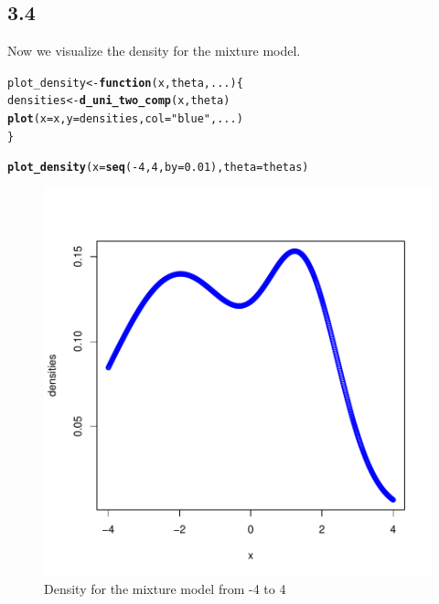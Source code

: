\documentclass[10pt, a4paper, english]{article}\usepackage[]{graphicx}\usepackage[dvipsnames]{xcolor}
\makeatletter
\def\maxwidth{ %
  \ifdim\Gin@nat@width>\linewidth
    \linewidth
  \else
    \Gin@nat@width
  \fi
}
\newcommand{\hlnum}[1]{\textcolor[rgb]{0.686,0.059,0.569}{#1}}%
\newcommand{\hlstr}[1]{\textcolor[rgb]{0.192,0.494,0.8}{#1}}%
\newcommand{\hlopt}[1]{\textcolor[rgb]{0,0,0}{#1}}%
\newcommand{\hlstd}[1]{\textcolor[rgb]{0.345,0.345,0.345}{#1}}%
\newcommand{\hlkwa}[1]{\textcolor[rgb]{0.161,0.373,0.58}{\textbf{#1}}}%
\newcommand{\hlkwb}[1]{\textcolor[rgb]{0.69,0.353,0.396}{#1}}%
\newcommand{\hlkwc}[1]{\textcolor[rgb]{0.333,0.667,0.333}{#1}}%
\newcommand{\hlkwd}[1]{\textcolor[rgb]{0.737,0.353,0.396}{\textbf{#1}}}%
\newenvironment{kframe}{%
 \def\at@end@of@kframe{}%
 \ifinner\ifhmode%
  \def\at@end@of@kframe{\end{minipage}}%
  \begin{minipage}{\columnwidth}%
 \fi\fi%
 \def\FrameCommand##1{\hskip\@totalleftmargin \hskip-\fboxsep
 \colorbox{shadecolor}{##1}\hskip-\fboxsep
     \hskip-\linewidth \hskip-\@totalleftmargin \hskip\columnwidth}%
 \MakeFramed {\advance\hsize-\width
   \@totalleftmargin\z@ \linewidth\hsize
   \@setminipage}}%
 {\par\unskip\endMakeFramed%
 \at@end@of@kframe}
\newenvironment{knitrout}{}{} %
\makeatother
\begin{document}
\subsection{3.4}
Now we visualize the density for the mixture model.
\begin{knitrout}
\color{fgcolor}\begin{kframe}
\begin{alltt}
\hlstd{plot_density} \hlkwb{<-} \hlkwa{function}\hlstd{(}\hlkwc{x}\hlstd{,} \hlkwc{theta}\hlstd{,}\hlkwc{...}\hlstd{)\{}
  \hlstd{densities} \hlkwb{<-} \hlkwd{d_uni_two_comp}\hlstd{(x, theta)}
  \hlkwd{plot}\hlstd{(}\hlkwc{x}\hlstd{=x,} \hlkwc{y}\hlstd{=densities,} \hlkwc{col}\hlstd{=}\hlstr{"blue"}\hlstd{, ...)}
\hlstd{\}}

\hlkwd{plot_density}\hlstd{(}\hlkwc{x}\hlstd{=}\hlkwd{seq}\hlstd{(}\hlopt{-}\hlnum{4}\hlstd{,}\hlnum{4}\hlstd{,} \hlkwc{by}\hlstd{=}\hlnum{0.01}\hlstd{),} \hlkwc{theta}\hlstd{=thetas)}
\end{alltt}
\end{kframe}\begin{figure}
\includegraphics[width=\maxwidth]{figure/unnamed-chunk-26-1} \caption[Density for the mixture model from -4 to 4]{Density for the mixture model from -4 to 4}\label{fig:unnamed-chunk-26}
\end{figure}

\end{knitrout}
\end{document}
